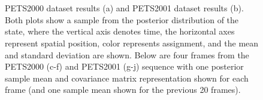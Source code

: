\documentclass[twocolumn, final]{svjour3}
\begin{document}
\begin{figure}[!]
   \hspace{1pt}
   \\           
   \hspace{1pt}
   \hspace{1pt}
   \hspace{1pt}
   \\
  \caption{PETS2000 dataset results (a) and PETS2001 dataset results (b). Both plots show a sample from the posterior distribution of the state, where the vertical axis denotes time, the horizontal axes represent spatial position, color represents assignment, and the mean and standard deviation are shown. Below are four frames from the PETS2000 (c-f) and PETS2001 (g-j) sequence with one posterior sample mean and covariance matrix representation shown for each frame (and one sample mean shown for the previous 20 frames).}
  \label{fig:pets2001_overlay}
\end{figure}
\end{document}
